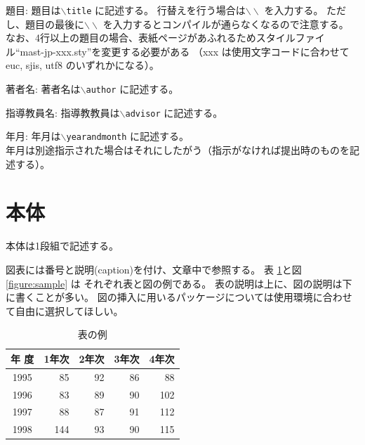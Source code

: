 \documentclass[a4paper,11pt]{jreport}
\begin{document}
\begin{description} \parskip=1pt
\item{題目: }
	題目は{\tt $\backslash$title} に記述する。
	行替えを行う場合は$\backslash\backslash$ を入力する。
	ただし、題目の最後に$\backslash\backslash$ を入力するとコンパイルが通らなくなるので注意する。
	なお、4行以上の題目の場合、表紙ページがあふれるためスタイルファイル``mast-jp-xxx.sty''を変更する必要がある
	（xxx は使用文字コードに合わせて euc, sjis, utf8 のいずれかになる）。
\item{著者名: }
	著者名は{\tt $\backslash$author} に記述する。
\item{指導教員名: }
	指導教教員は{\tt $\backslash$advisor} に記述する。
\item{年月: }
	年月は{\tt $\backslash$yearandmonth} に記述する。
	\\
	年月は別途指示された場合はそれにしたがう（指示がなければ提出時のものを記述する）。
\end{description}

\section{本体}

本体は1段組で記述する。

図表には番号と説明(caption)を付け、文章中で参照する。
表 \ref{table:fundamental_data_type}と図\ref{figure:sample} は
それぞれ表と図の例である。
表の説明は上に、図の説明は下に書くことが多い。
図の挿入に用いるパッケージについては使用環境に合わせて自由に選択してほしい。

\begin{table}[hbt]
\caption{表の例}
\label{table:fundamental_data_type}
\begin{center}
\begin{tabular}{| c | r | r | r | r |}
\hline
年 度 & 1年次 & 2年次 & 3年次 & 4年次 \\
\hline
1995 & 85 & 92 & 86 & 88 \\
1996 & 83 & 89 & 90 & 102 \\
1997 & 88 & 87 & 91 & 112 \\
1998 & 144 & 93 & 90 & 115 \\
\hline 
\end{tabular}
\end{center}
\end{table}
\medskip
\end{document}
